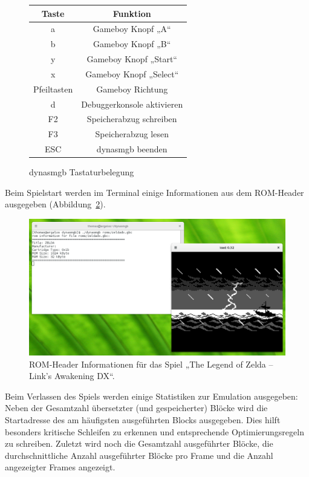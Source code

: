 \documentclass[a4paper]{scrartcl}
\begin{document}
\begin{figure}[htbp]
\centering
\begin{tabular}{c|c}
Taste&Funktion \\
\hline
a&Gameboy Knopf „A“ \\
b&Gameboy Knopf „B“ \\
y&Gameboy Knopf „Start“ \\
x&Gameboy Knopf „Select“ \\
Pfeiltasten&Gameboy Richtung \\
d&Debuggerkonsole aktivieren \\
F2&Speicherabzug schreiben \\
F3&Speicherabzug lesen \\
ESC&dynasmgb beenden
\end{tabular}
\caption{dynasmgb Tastaturbelegung}
\label{tab:keys}
\end{figure}

Beim Spielstart werden im Terminal einige Informationen aus dem ROM-Header ausgegeben (Abbildung~\ref{img:zelda_start}).

\begin{figure}[htbp]
\centering
\includegraphics[width=\linewidth]{img/zelda_start}
\caption{ROM-Header Informationen für das Spiel „The Legend of Zelda -- Link's Awakening DX“.}
\label{img:zelda_start}
\end{figure}

Beim Verlassen des Spiels werden einige Statistiken zur Emulation ausgegeben: Neben der Gesamtzahl übersetzter (und gespeicherter) Blöcke wird die Startadresse des am häufigsten ausgeführten Blocks ausgegeben. Dies hilft besonders kritische Schleifen zu erkennen und entsprechende Optimierungsregeln zu schreiben. Zuletzt wird noch die Gesamtzahl ausgeführter Blöcke, die durchschnittliche Anzahl ausgeführter Blöcke pro Frame und die Anzahl angezeigter Frames angezeigt.
\end{document}
